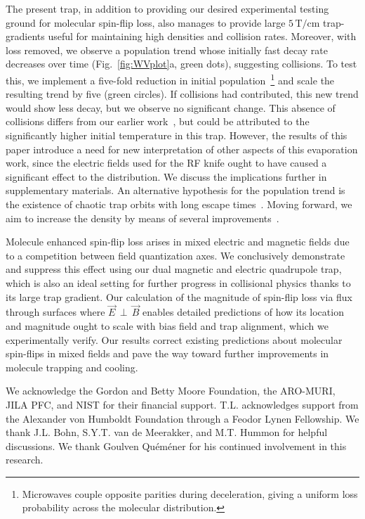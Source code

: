 \documentclass[%
 reprint,
 amsmath,amssymb,
 aps,
prl,
]{revtex4-1}
\newcommand{\epb}{{$\vec{E}\,{\perp}\,\vec{B}$}}
\begin{document}
The present trap, in addition to providing our desired experimental testing ground for molecular spin-flip loss, also manages to provide large $5\,\text{T/cm}$ trap-gradients useful for maintaining high densities and collision rates.
Moreover, with loss removed, we observe a population trend whose initially fast decay rate decreases over time (Fig.~\ref{fig:WVplot}a, green dots), suggesting collisions.
To test this, we implement a five-fold reduction in initial population~\footnote{Microwaves couple opposite parities during deceleration, giving a uniform loss probability across the molecular distribution.} and scale the resulting trend by five (green circles). 
If collisions had contributed, this new trend would show less decay, but we observe no significant change. 
This absence of collisions differs from our earlier work~\cite{Stuhl2012evap}, but could be attributed to the significantly higher initial temperature in this trap. 
However, the results of this paper introduce a need for new interpretation of other aspects of this evaporation work, since the electric fields used for the RF knife ought to have caused a significant effect to the distribution.
We discuss the implications further in supplementary materials.
An alternative hypothesis for the population trend is the existence of chaotic trap orbits with long escape times~\cite{Gonzalez-Ferez2014}.
Moving forward, we aim to increase the density by means of several improvements~\cite{Even2015,Segev2017}.

Molecule enhanced spin-flip loss arises in mixed electric and magnetic fields due to a competition between field quantization axes.
We conclusively demonstrate and suppress this effect using our dual magnetic and electric quadrupole trap, which is also an ideal setting for further progress in collisional physics thanks to its large trap gradient.
Our calculation of the magnitude of spin-flip loss via flux through surfaces where \epb{} enables detailed predictions of how its location and magnitude ought to scale with bias field and trap alignment, which we experimentally verify.
Our results correct existing predictions about molecular spin-flips in mixed fields and pave the way toward further improvements in molecule trapping and cooling.

\begin{acknowledgments}
We acknowledge the Gordon and Betty Moore Foundation, the ARO-MURI, JILA PFC, and NIST for their financial support. 
T.L. acknowledges support from the Alexander von Humboldt Foundation through a Feodor Lynen Fellowship. 
We thank J.L. Bohn, S.Y.T. van de Meerakker, and M.T. Hummon for helpful discussions. 
We thank Goulven Qu\'em\'ener for his continued involvement in this research.
\end{acknowledgments}



\end{document}
